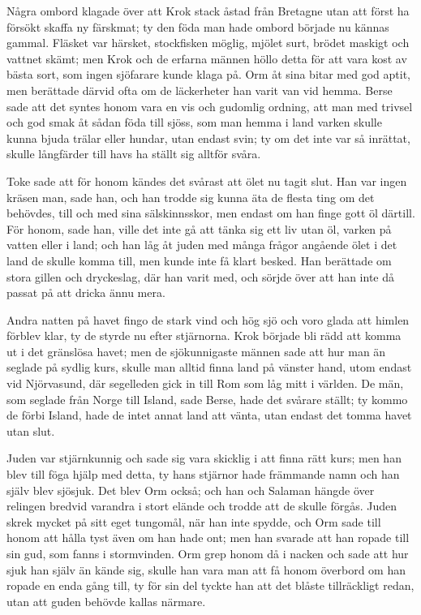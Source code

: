 \initial Några ombord klagade över att Krok stack åstad från Bretagne utan att först ha försökt skaffa ny färskmat; ty den föda man hade ombord började nu kännas gammal. Fläsket var härsket, stockfisken möglig, mjölet surt, brödet maskigt och vattnet skämt; men Krok och de erfarna männen höllo detta för att vara kost av bästa sort, som ingen sjöfarare kunde klaga på. Orm åt sina bitar med god aptit, men berättade därvid ofta om de läckerheter han varit van vid hemma. Berse sade att det syntes honom vara en vis och gudomlig ordning, att man med trivsel och god smak åt sådan föda till sjöss, som man hemma i land varken skulle kunna bjuda trälar eller hundar, utan endast svin; ty om det inte var så inrättat, skulle långfärder till havs ha ställt sig alltför svåra.

\initial Toke sade att för honom kändes det svårast att ölet nu tagit slut. Han var ingen kräsen man, sade han, och han trodde sig kunna äta de flesta ting om det behövdes, till och med sina sälskinnsskor, men endast om han finge gott öl därtill. För honom, sade han, ville det inte gå att tänka sig ett liv utan öl, varken på vatten eller i land; och han låg åt juden med många frågor angående ölet i det land de skulle komma till, men kunde inte få klart besked. Han berättade om stora gillen och dryckeslag, där han varit med, och sörjde över att han inte då passat på att dricka ännu mera.

\initial Andra natten på havet fingo de stark vind och hög sjö och voro glada att himlen förblev klar, ty de styrde nu efter stjärnorna. Krok började bli rädd att komma ut i det gränslösa havet; men de sjökunnigaste männen sade att hur man än seglade på sydlig kurs, skulle man alltid finna land på vänster hand, utom endast vid Njörvasund, där segelleden gick in till Rom som låg mitt i världen. De män, som seglade från Norge till Island, sade Berse, hade det svårare ställt; ty kommo de förbi Island, hade de intet annat land att vänta, utan endast det tomma havet utan slut.

\initial Juden var stjärnkunnig och sade sig vara skicklig i att finna rätt kurs; men han blev till föga hjälp med detta, ty hans stjärnor hade främmande namn och han själv blev sjösjuk. Det blev Orm också; och han och Salaman hängde över relingen bredvid varandra i stort elände och trodde att de skulle förgås. Juden skrek mycket på sitt eget tungomål, när han inte spydde, och Orm sade till honom att hålla tyst även om han hade ont; men han svarade att han ropade till sin gud, som fanns i stormvinden. Orm grep honom då i nacken och sade att hur sjuk han själv än kände sig, skulle han vara man att få honom överbord om han ropade en enda gång till, ty för sin del tyckte han att det blåste tillräckligt redan, utan att guden behövde kallas närmare.

